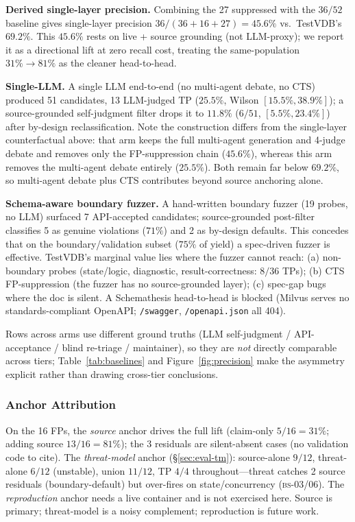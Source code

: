 \documentclass[sigconf]{acmart}
\begin{document}
\textbf{Derived single-layer precision.} Combining the 27 suppressed with the $36/52$ baseline gives single-layer precision $36/(36{+}16{+}27)=45.6\%$ vs.\ TestVDB's $69.2\%$. This $45.6\%$ rests on live + source grounding (not LLM-proxy); we report it as a directional lift at zero recall cost, treating the same-population $31\%\to 81\%$ as the cleaner head-to-head.

\textbf{Single-LLM.} A single LLM end-to-end (no multi-agent debate, no CTS) produced 51 candidates, 13 LLM-judged TP ($25.5\%$, Wilson $[15.5\%, 38.9\%]$); a source-grounded self-judgment filter drops it to $11.8\%$ ($6/51$, $[5.5\%, 23.4\%]$) after by-design reclassification. Note the construction differs from the single-layer counterfactual above: that arm keeps the full multi-agent generation and 4-judge debate and removes only the FP-suppression chain ($45.6\%$), whereas this arm removes the multi-agent debate entirely ($25.5\%$). Both remain far below $69.2\%$, so multi-agent debate plus CTS contributes beyond source anchoring alone.

\textbf{Schema-aware boundary fuzzer.} A hand-written boundary fuzzer (19 probes, no LLM) surfaced 7 API-accepted candidates; source-grounded post-filter classifies 5 as genuine violations ($71\%$) and 2 as by-design defaults. This concedes that on the boundary/validation subset ($75\%$ of yield) a spec-driven fuzzer is effective. TestVDB's marginal value lies where the fuzzer cannot reach: (a) non-boundary probes (state/logic, diagnostic, result-correctness: $8/36$ TPs); (b) CTS FP-suppression (the fuzzer has no source-grounded layer); (c) spec-gap bugs where the doc is silent. A Schemathesis head-to-head is blocked (Milvus serves no standards-compliant OpenAPI; \texttt{/swagger}, \texttt{/openapi.json} all 404).

Rows across arms use different ground truths (LLM self-judgment / API-acceptance / blind re-triage / maintainer), so they are \emph{not} directly comparable across tiers; Table~\ref{tab:baselines} and Figure~\ref{fig:precision} make the asymmetry explicit rather than drawing cross-tier conclusions.

\subsubsection{Anchor Attribution}
On the 16 FPs, the \emph{source} anchor drives the full lift (claim-only $5/16=31\%$; adding source $13/16=81\%$); the 3 residuals are silent-absent cases (no validation code to cite). The \emph{threat-model} anchor (\S\ref{sec:eval-tm}): source-alone $9/12$, threat-alone $6/12$ (unstable), union $11/12$, TP $4/4$ throughout---threat catches 2 source residuals (boundary-default) but over-fires on state/concurrency (\textsc{bs-}03/06). The \emph{reproduction} anchor needs a live container and is not exercised here. Source is primary; threat-model is a noisy complement; reproduction is future work.
\end{document}
